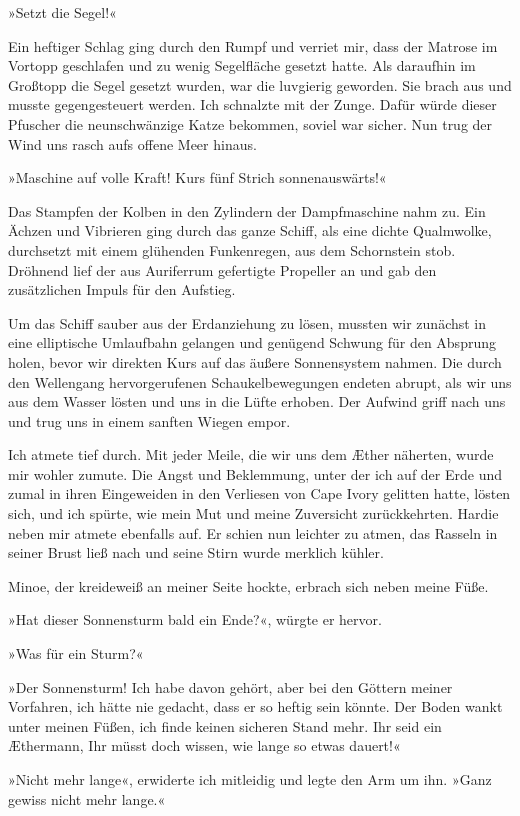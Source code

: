 »Setzt die Segel!«

Ein heftiger Schlag ging durch den Rumpf und verriet mir, dass der
Matrose im Vortopp geschlafen und zu wenig Segelfläche gesetzt
hatte. Als daraufhin im Großtopp die Segel gesetzt wurden, war die
 luvgierig geworden. Sie brach aus und musste
gegengesteuert werden. Ich schnalzte mit der Zunge. Dafür würde
dieser Pfuscher die neunschwänzige Katze bekommen, soviel war
sicher. Nun trug der Wind uns rasch aufs offene Meer hinaus.

»Maschine auf volle Kraft! Kurs fünf Strich sonnenauswärts!«

Das Stampfen der Kolben in den Zylindern der Dampfmaschine nahm zu.
Ein Ächzen und Vibrieren ging durch das ganze Schiff, als eine
dichte Qualmwolke, durchsetzt mit einem glühenden Funkenregen, aus
dem Schornstein stob. Dröhnend lief der aus Auriferrum gefertigte
Propeller an und gab den zusätzlichen Impuls für den Aufstieg.

Um das Schiff sauber aus der Erdanziehung zu lösen, mussten wir
zunächst in eine elliptische Umlaufbahn gelangen und genügend
Schwung für den Absprung holen, bevor wir direkten Kurs auf das
äußere Sonnensystem nahmen. Die durch den Wellengang
hervorgerufenen Schaukelbewegungen endeten abrupt, als wir uns aus
dem Wasser lösten und uns in die Lüfte erhoben. Der Aufwind griff
nach uns und trug uns in einem sanften Wiegen empor.

Ich atmete tief durch. Mit jeder Meile, die wir uns dem Æther
näherten, wurde mir wohler zumute. Die Angst und Beklemmung, unter
der ich auf der Erde und zumal in ihren Eingeweiden in den
Verliesen von Cape Ivory gelitten hatte, lösten sich, und ich
spürte, wie mein Mut und meine Zuversicht zurückkehrten. Hardie
neben mir atmete ebenfalls auf. Er schien nun leichter zu atmen,
das Rasseln in seiner Brust ließ nach und seine Stirn wurde
merklich kühler.

Minoe, der kreideweiß an meiner Seite hockte, erbrach sich neben
meine Füße.

»Hat dieser Sonnensturm bald ein Ende?«, würgte er hervor.

»Was für ein Sturm?«

»Der Sonnensturm! Ich habe davon gehört, aber bei den Göttern
meiner Vorfahren, ich hätte nie gedacht, dass er so heftig sein
könnte. Der Boden wankt unter meinen Füßen, ich finde keinen
sicheren Stand mehr. Ihr seid ein Æthermann, Ihr müsst doch wissen,
wie lange so etwas dauert!«

»Nicht mehr lange«, erwiderte ich mitleidig und legte den Arm um
ihn. »Ganz gewiss nicht mehr lange.«

